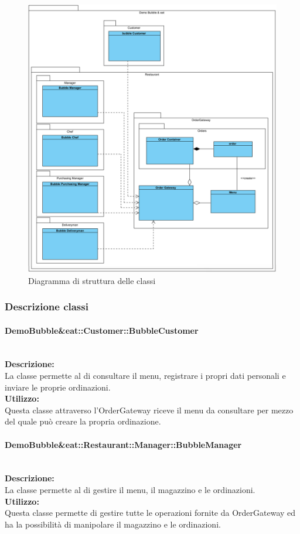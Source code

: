 	\begin{figure}[H]
		\centering
		\includegraphics[width=13cm]{diagrammi_img/classi_e_package/demo_classes.png}
		\caption{Diagramma di struttura delle classi}
	\end{figure}

\subsubsection{Descrizione classi}

\paragraph{DemoBubble\&eat\-::Customer\-::Bubble\-Customer}\label{eat-customer}\mbox{}\\
\textbf{Descrizione:}\\ \nopagebreak
La classe permette al \Customer{} di consultare il menu, registrare i propri dati personali e inviare le proprie ordinazioni.\\
\textbf{Utilizzo:}\\ \nopagebreak
Questa classe attraverso l'Order\-Gateway riceve il menu da consultare per mezzo del quale può creare la propria ordinazione.

\paragraph{Demo\-Bubble\&eat\-::Restaurant\-::Manager\-::Bubble\-Manager}\label{eat-manager}\mbox{}\\
\textbf{Descrizione:}\\ \nopagebreak
La classe permette al \Manager{} di gestire il menu, il magazzino e le ordinazioni.\\
\textbf{Utilizzo:}\\ \nopagebreak
Questa classe permette di gestire tutte le operazioni fornite da Order\-Gateway ed ha la possibilità di manipolare il magazzino e le ordinazioni.

